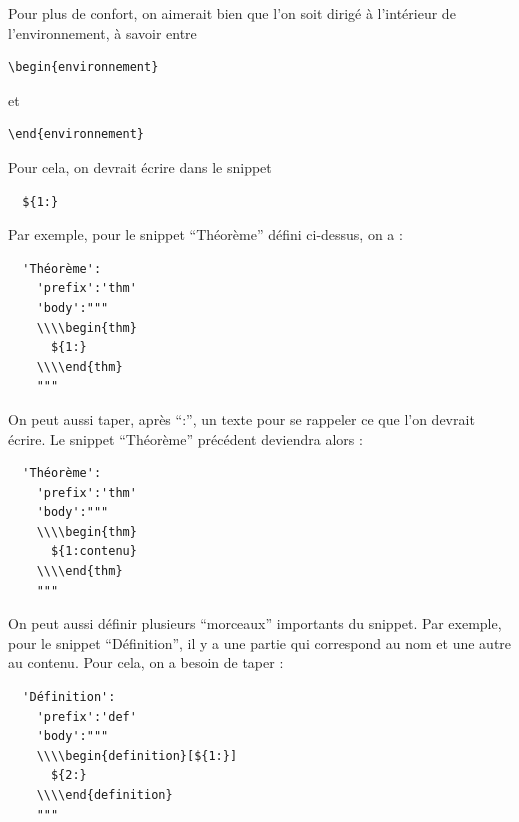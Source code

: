 \documentclass[french]{article}
\newtheorem{prototheorem}{Théorème}[section]
\newenvironment{thm}
   {\colorlet{shadecolor}{orange!10}\begin{shaded}\begin{prototheorem}}
   {\end{prototheorem}\end{shaded}}
\theoremstyle{definition}
\newtheorem{protodefinition}{Définition}[section]
\newenvironment{definition}
    {\colorlet{shadecolor}{green!5}\begin{shaded}\begin{protodefinition}}
    {\end{protodefinition}\end{shaded}}
\theoremstyle{remark}
\begin{document}
Pour plus de confort, on aimerait bien que l'on soit dirigé à l'intérieur de l'environnement, à savoir entre

\begin{verbatim}
\begin{environnement}
\end{verbatim}

et

\begin{verbatim}
\end{environnement}
\end{verbatim}

Pour cela, on devrait écrire dans le snippet

\begin{verbatim}
  ${1:}
\end{verbatim}

Par exemple, pour le snippet ``Théorème'' défini ci-dessus, on a :

\begin{verbatim}
  'Théorème':
    'prefix':'thm'
    'body':"""
    \\\\begin{thm}
      ${1:}
    \\\\end{thm}
    """
\end{verbatim}

On peut aussi taper, après ``:'', un texte pour se rappeler ce que l'on devrait écrire. Le snippet ``Théorème'' précédent deviendra alors :

\begin{verbatim}
  'Théorème':
    'prefix':'thm'
    'body':"""
    \\\\begin{thm}
      ${1:contenu}
    \\\\end{thm}
    """
\end{verbatim}

On peut aussi définir plusieurs ``morceaux'' importants du snippet. Par exemple, pour le snippet ``Définition'', il y a une partie qui correspond au nom et une autre au contenu. Pour cela, on a besoin de taper :

\begin{verbatim}
  'Définition':
    'prefix':'def'
    'body':"""
    \\\\begin{definition}[${1:}]
      ${2:}
    \\\\end{definition}
    """
\end{verbatim}
\end{document}
